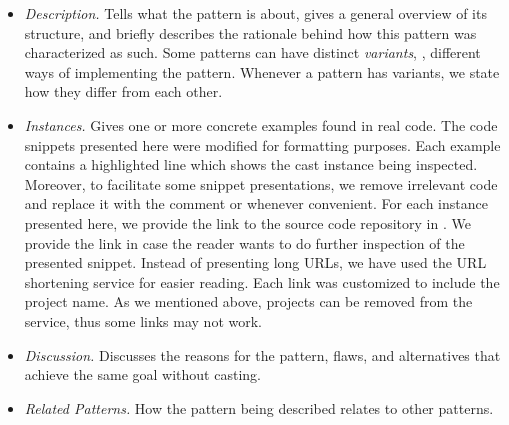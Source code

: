 \begin{itemize}

\item \textit{Description.}
Tells what the pattern is about, gives a general overview of its structure, and
briefly describes the rationale behind how this pattern was characterized as such.
Some patterns can have distinct \emph{variants}, \ie,
different ways of implementing the pattern.
Whenever a pattern has variants,
we state how they differ from each other.

\item \textit{Instances.}
Gives one or more concrete examples found in real code.
The code snippets presented here were modified for formatting purposes.
Each example contains a highlighted line which shows the cast instance being inspected.
Moreover, to facilitate some snippet presentations,
we remove irrelevant code and replace it with the comment
\code{// [...]} or \code{/* [...] */} whenever convenient.
For each instance presented here,
we provide the link to the source code repository in \lgtm{}.
We provide the link in case the reader wants to do further inspection of the presented snippet.
Instead of presenting long \lgtm{} URLs,
we have used the URL shortening service
\href{https://bitly.com/}{\bitly} for easier reading.
Each \bitly{} link was customized to include the project name.
As we mentioned above, projects can be removed from the \lgtm{} service,
thus some links may not work.

\item \textit{Discussion.}
Discusses the reasons for the pattern, flaws, and alternatives that achieve the same goal without casting.

\item \textit{Related Patterns.}
How the pattern being described relates to other patterns.

\end{itemize}


\newcommand\urlbox{\null\hfill\colorbox{lightgray}{\scriptsize\url{\urlvar}}}

\newcommand\castpatternsection[1]{\paragraph{#1.}}
\newcommand\variant[1]{\textsl{#1}}
\newenvironment{pattern}[1]{
    \newcommand{\nocc}{\csname n#1Pattern\endcsname{}}
    \newcommand{\noccsrc}{\csname n#1PatternSrc\endcsname{}}
    \newcommand{\noccgen}{\csname n#1PatternGen\endcsname{}}
    \newcommand{\nocctest}{\csname n#1PatternTest\endcsname{}}
    \newcommand{\pocc}{\csname p#1Pattern\endcsname{}}
    \newcommand{\instances}{\castpatternsection{Instances: \nocc{} (\pocc\%)}
    We found \noccsrc{} in application code, \nocctest{} in test code, and \noccgen{} in generated code.}
    \newcommand{\discussion}{\castpatternsection{Discussion}}
    \newcommand{\related}{\castpatternsection{Related Patterns}}
    \newcommand{\thisp}{\textsc{#1}}
    \subsection{\textsc{#1}}
    \label{pat:#1}
    \castpatternsection{Description}
}{}


